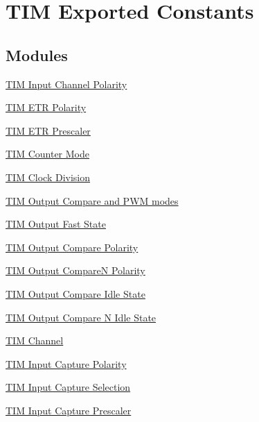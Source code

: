 \hypertarget{group___t_i_m___exported___constants}{}\section{T\+IM Exported Constants}
\label{group___t_i_m___exported___constants}
\subsection*{Modules}
\begin{DoxyCompactItemize}
\item 
\hyperlink{group___t_i_m___input___channel___polarity}{T\+I\+M Input Channel Polarity}
\item 
\hyperlink{group___t_i_m___e_t_r___polarity}{T\+I\+M E\+T\+R Polarity}
\item 
\hyperlink{group___t_i_m___e_t_r___prescaler}{T\+I\+M E\+T\+R Prescaler}
\item 
\hyperlink{group___t_i_m___counter___mode}{T\+I\+M Counter Mode}
\item 
\hyperlink{group___t_i_m___clock_division}{T\+I\+M Clock Division}
\item 
\hyperlink{group___t_i_m___output___compare__and___p_w_m__modes}{T\+I\+M Output Compare and P\+W\+M modes}
\item 
\hyperlink{group___t_i_m___output___fast___state}{T\+I\+M Output Fast State}
\item 
\hyperlink{group___t_i_m___output___compare___polarity}{T\+I\+M Output Compare Polarity}
\item 
\hyperlink{group___t_i_m___output___compare___n___polarity}{T\+I\+M Output Compare\+N Polarity}
\item 
\hyperlink{group___t_i_m___output___compare___idle___state}{T\+I\+M Output Compare Idle State}
\item 
\hyperlink{group___t_i_m___output___compare___n___idle___state}{T\+I\+M Output Compare N Idle State}
\item 
\hyperlink{group___t_i_m___channel}{T\+I\+M Channel}
\item 
\hyperlink{group___t_i_m___input___capture___polarity}{T\+I\+M Input Capture Polarity}
\item 
\hyperlink{group___t_i_m___input___capture___selection}{T\+I\+M Input Capture Selection}
\item 
\hyperlink{group___t_i_m___input___capture___prescaler}{T\+I\+M Input Capture Prescaler}
\item 

\end{DoxyCompactItemize}

